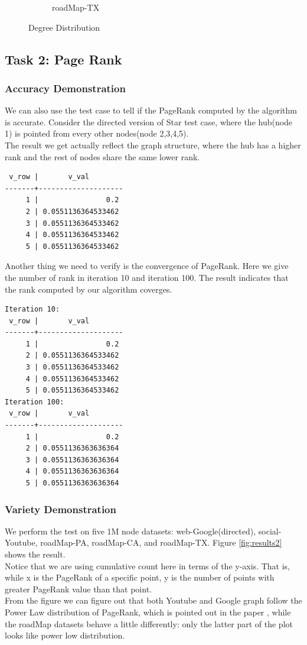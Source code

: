 \begin{figure}
\begin{subfigure}[htbp]{0.9\textwidth}
                \caption{roadMap-TX}
                \label{fig:dd-tx}
        \end{subfigure}
        \caption{Degree Distribution}
        \label{fig:results1}
\end{figure}


\subsection{Task 2: Page Rank}
\subsubsection{Accuracy Demonstration}
We can also use the test case to tell if the PageRank computed by the algorithm is accurate. Consider the directed version of Star test case, where the hub(node 1) is pointed from every other nodes(node 2,3,4,5).\\
The result we get actually reflect the graph structure, where the hub has a higher rank and the rest of nodes share the same lower rank.
\begin{verbatim}
 v_row |       v_val        
-------+--------------------
     1 |                0.2
     2 | 0.0551136364533462
     3 | 0.0551136364533462
     4 | 0.0551136364533462
     5 | 0.0551136364533462
\end{verbatim}
Another thing we need to verify is the convergence of PageRank. Here we give the number of rank in iteration 10 and iteration 100. The result indicates that the rank computed by our algorithm coverges.
\begin{verbatim}
Iteration 10:
 v_row |       v_val        
-------+--------------------
     1 |                0.2
     2 | 0.0551136364533462
     3 | 0.0551136364533462
     4 | 0.0551136364533462
     5 | 0.0551136364533462
Iteration 100:
 v_row |       v_val        
-------+--------------------
     1 |                0.2
     2 | 0.0551136363636364
     3 | 0.0551136363636364
     4 | 0.0551136363636364
     5 | 0.0551136363636364
\end{verbatim}


\subsubsection{Variety Demonstration}
We perform the test on five 1M node datasets: web-Google(directed), social-Youtube, roadMap-PA, roadMap-CA, and roadMap-TX. Figure \ref{fig:results2} shows the result.\\
Notice that we are using cumulative count here in terms of the y-axis. That is, while x is the PageRank of a specific point, y is the number of points with greater PageRank value than that point.\\
From the figure we can figure out that both Youtube and Google graph follow the Power Law distribution of PageRank, which is pointed out in the paper \cite{Brin:1998:ALH:297810.297827}, while the roadMap datasets behave a little differently: only the latter part of the plot looks like power low distribution.

